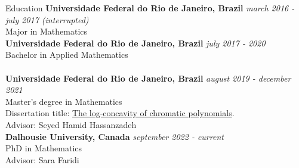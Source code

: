 \documentclass{resume} %
\begin{document}

\begin{rSection}{Education}
{\bf Universidade Federal do Rio de Janeiro, Brazil} \hfill {\em march 2016 - july 2017 (interrupted)} 
\\ Major in Mathematics\\
{\bf Universidade Federal do Rio de Janeiro, Brazil} \hfill {\em july 2017 - 2020} 
\\ Bachelor in Applied Mathematics
\\
\\{\bf Universidade Federal do Rio de Janeiro, Brazil} \hfill {\em august 2019 - december 2021} 
\\ Master's degree in Mathematics
\\ Dissertation title: \href{https://hollebenthiago.github.io/msc/main.pdf}{The log-concavity of chromatic polynomials}.
\\ Advisor: Seyed Hamid Hassanzadeh
\\{\bf Dalhousie University, Canada} \hfill {\em september 2022 - current} 
\\ PhD in Mathematics
\\ Advisor: Sara Faridi

\end{rSection}

\end{document}
